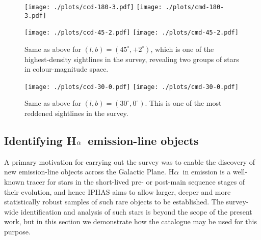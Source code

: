 \documentclass[useAMS,usenatbib]{mn2e}
\def\ha{\mbox{H$\rm \alpha$}}
\begin{document}
\begin{figure*}
    \begin{minipage}[b]{\linewidth}
        \texttt{[image: ./plots/ccd-180-3.pdf]} 
        \texttt{[image: ./plots/cmd-180-3.pdf]}
    \end{minipage}
    \caption{Colour-colour and colour-magnitude diagram (left and right panel)
    showing sources flagged as \emph{veryReliable}
    located in an area of one square degree
    centred near the Galactic anti-centre 
    at $(l,b)=(180^\circ,+3^\circ)$.
    The colour-colour diagram shows the
    position of the main sequence (thin solid line),
    giant stars (thick solid line)
    and the reddening track for an A0V-type star (dashed line)
    based on the \citet{Pickles1998} library of empirical spectra.
    The colour-magnitude only show the reddening vector
    along with the unreddened 1~Gyr isochrone due to \citet{Bressan2012},
    which has been placed at an arbitrary distance of 2~kpc for reference.
    This is one of the least reddened sightlines
    in the survey %
    and hence the observed stellar population appears to be dominated 
    by lowly reddened main sequence stars.}
    \label{fig:l180}
    \begin{minipage}[b]{\linewidth}
        \texttt{[image: ./plots/ccd-45-2.pdf]}
        \texttt{[image: ./plots/cmd-45-2.pdf]}
    \end{minipage}
    \caption{Same as above for $(l,b)=(45^\circ,+2^\circ)$,
    which is one of the highest-density sightlines in the survey,
    revealing two groups of stars in colour-magnitude space.}
    \label{fig:l45}
    \begin{minipage}[b]{\linewidth}
        \texttt{[image: ./plots/ccd-30-0.pdf]}
        \texttt{[image: ./plots/cmd-30-0.pdf]} 
    \end{minipage}
    \caption{Same as above for $(l,b)=(30^\circ,0^\circ)$.
    This is one of the most reddened sightlines in the survey.
    }
    \label{fig:l30}
\end{figure*}

\subsection{Identifying \ha\ emission-line objects}

A primary motivation for carrying
out the survey 
was to enable the discovery of 
new emission-line objects across the Galactic Plane.
\ha\ in emission is a well-known tracer
for stars in the short-lived pre- or
post-main sequence stages of their evolution,
and hence IPHAS aims to allow larger, deeper
and more statistically robust samples of such rare objects
to be established.
The survey-wide identification and analysis 
of such stars is beyond the scope of the present work,
but in this section we demonstrate how the
catalogue may be used for this purpose.
\end{document}
